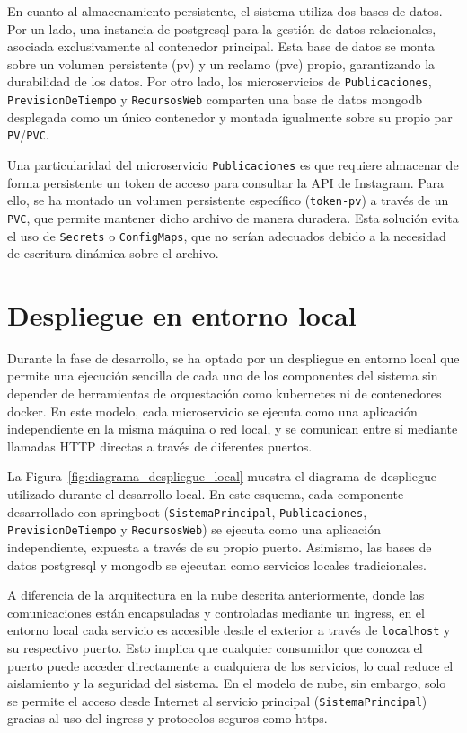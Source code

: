 En cuanto al almacenamiento persistente, el sistema utiliza dos bases de datos. Por un lado, una instancia de \gls{postgresql} para la gestión de datos relacionales, asociada exclusivamente al contenedor principal. Esta base de datos se monta sobre un volumen persistente (\gls{pv}) y un reclamo (\gls{pvc}) propio, garantizando la durabilidad de los datos. Por otro lado, los microservicios de \texttt{Publicaciones}, \texttt{PrevisionDeTiempo} y \texttt{RecursosWeb} comparten una base de datos \gls{mongodb} desplegada como un único contenedor y montada igualmente sobre su propio par \texttt{PV}/\texttt{PVC}.

Una particularidad del microservicio \texttt{Publicaciones} es que requiere almacenar de forma persistente un \gls{token} de acceso para consultar la \gls{API} de Instagram. Para ello, se ha montado un volumen persistente específico (\texttt{token-pv}) a través de un \texttt{PVC}, que permite mantener dicho archivo de manera duradera. Esta solución evita el uso de \texttt{Secrets} o \texttt{ConfigMaps}, que no serían adecuados debido a la necesidad de escritura dinámica sobre el archivo.

\section{Despliegue en entorno local}

Durante la fase de desarrollo, se ha optado por un despliegue en entorno local que permite una ejecución sencilla de cada uno de los componentes del sistema sin depender de herramientas de orquestación como \gls{kubernetes} ni de contenedores \gls{docker}. En este modelo, cada microservicio se ejecuta como una aplicación independiente en la misma máquina o red local, y se comunican entre sí mediante llamadas HTTP directas a través de diferentes puertos.

La Figura~\ref{fig:diagrama_despliegue_local} muestra el diagrama de despliegue utilizado durante el desarrollo local. En este esquema, cada componente desarrollado con \gls{springboot} (\texttt{SistemaPrincipal}, \texttt{Publicaciones}, \texttt{PrevisionDeTiempo} y \texttt{RecursosWeb}) se ejecuta como una aplicación independiente, expuesta a través de su propio puerto. Asimismo, las bases de datos \gls{postgresql} y \gls{mongodb} se ejecutan como servicios locales tradicionales.

A diferencia de la arquitectura en la nube descrita anteriormente, donde las comunicaciones están encapsuladas y controladas mediante un \gls{ingress}, en el entorno local cada servicio es accesible desde el exterior a través de \texttt{localhost} y su respectivo puerto. Esto implica que cualquier consumidor que conozca el puerto puede acceder directamente a cualquiera de los servicios, lo cual reduce el aislamiento y la seguridad del sistema. En el modelo de nube, sin embargo, solo se permite el acceso desde Internet al servicio principal (\texttt{SistemaPrincipal}) gracias al uso del \gls{ingress} y protocolos seguros como \gls{https}.

